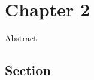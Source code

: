 \setlength{\headheight}{1.2cm}
\renewcommand{\publ}{\flushleft\footnotesize{Based on:\\[0.1cm]
		\textit{``Title''} \\[0.1cm]
}}

\chapter{Chapter 2}
\label{chap:2}


\begin{Abstract}
Abstract
\end{Abstract}

\section{Section}
\label{sec:2.1}
